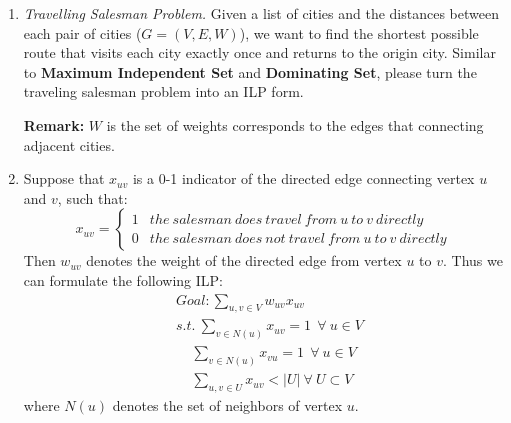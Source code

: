\documentclass[12pt,a4paper]{article}
\makeatletter
\newtheorem*{solution}{Solution}
\theoremstyle{definition}
\renewenvironment{solution}[1][Solution] {\par\pushQED{\qed}\normalfont\topsep6\p@\@plus6\p@\relax\trivlist\item[\hskip\labelsep\bfseries#1\@addpunct{.}]\ignorespaces}{\popQED\endtrivlist\@endpefalse} \makeatother
\makeatother
\begin{document}
\begin{enumerate}
    \item 
    \textit{Travelling Salesman Problem.} Given a list of cities and the distances between each pair of cities ($ G=(V,E,W) $), we want to find the shortest possible route that visits each city exactly once and returns to the origin city. Similar to \textbf{Maximum Independent Set} and \textbf{Dominating Set}, please turn the traveling salesman problem into an ILP form.  
    
    \textbf{Remark:} $ W $ is the set of weights corresponds to the edges that connecting adjacent cities.  
    \begin{solution}
    Suppose that $x_{uv}$ is a 0-1 indicator of the directed edge connecting vertex $u$ and $v$, such that:
    \begin{equation}\nonumber
        x_{uv}=
        \begin{cases}
        1 & the\ salesman\ does\ travel\ from\ u\ to\ v\ directly \\
        0 & the\ salesman\ does\ not\ travel\ from\ u\ to\ v\ directly
        \end{cases}
    \end{equation}
    Then $w_{uv}$ denotes the weight of the directed edge from vertex $u$ to $v$.
    Thus we can formulate the following ILP:
    \begin{equation}\nonumber
        \begin{split}
            & Goal:  \sum\limits_{u,v\in V} w_{uv}x_{uv}\\
            & s.t.\  \sum\limits_{v\in N(u)} x_{uv}=1\ \ \forall\ u\in V\\
            & \ \ \ \ \ \sum\limits_{v\in N(u)} x_{vu}=1\ \ \forall\ u \in V\\
            & \ \ \ \ \ \sum\limits_{u,v \in U}x_{uv}<|U|\ \forall\ U\subset V
        \end{split}
    \end{equation}
    where $N(u)$ denotes the set of neighbors of vertex $u$.
    \end{solution}
    

\end{enumerate}
\end{document}
